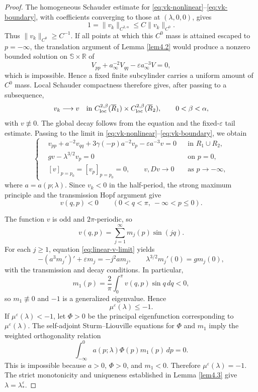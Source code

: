 \documentclass[11pt,reqno]{amsart}
\numberwithin{equation}{section}
\theoremstyle{definition}
\theoremstyle{remark}
\begin{document}
\begin{proof}
The homogeneous Schauder estimate for
\eqref{eq:vk-nonlinear}--\eqref{eq:vk-boundary}, with coefficients
converging to those at $(\lambda,0,0)$, gives
\[
 1=\|v_k\|_{C^{2,\alpha}}
 \leq C\|v_k\|_{C^0}.
\]
Thus $\|v_k\|_{C^0}\geq C^{-1}$.  If all points at which this
$C^0$ mass is attained escaped to $p=-\infty$, the translation
argument of Lemma \ref{lem4.2} would produce a nonzero bounded
solution on $\mathbb S\times\mathbb R$ of
\[
 V_{pp}+a_\infty^{-2}V_{qq}
 -\varepsilon a_\infty^{-3}V=0,
\]
which is impossible.  Hence a fixed finite subcylinder carries a
uniform amount of $C^0$ mass.  Local Schauder compactness therefore
gives, after passing to a subsequence,
\[
 v_k\longrightarrow v
 \quad\text{in }C^{2,\beta}_{\rm loc}(\overline R_1)
 \times C^{2,\beta}_{\rm loc}(\overline R_2),
 \qquad 0<\beta<\alpha,
\]
with $v\not\equiv0$.  The global decay follows from the equation and
the fixed-$\varepsilon$ tail estimate.  Passing to the limit in
\eqref{eq:vk-nonlinear}--\eqref{eq:vk-boundary}, we obtain
\begin{equation}\label{eq:linear-v-limit}
 \left\{
 \begin{aligned}
 &v_{pp}+a^{-2}v_{qq}+3\gamma(-p)a^{-2}v_p
   -\varepsilon a^{-3}v=0
   &&\text{in }R_1\cup R_2,\\
 &gv-\lambda^{3/2}v_p=0
   &&\text{on }p=0,\\
 &[v]_{p=p_0}=[v_p]_{p=p_0}=0,
 \qquad v,Dv\to0 &&\text{as }p\to-\infty,
 \end{aligned}
 \right.
\end{equation}
where $a=a(p;\lambda)$.  Since $v_k<0$ in the half-period, the
strong maximum principle and the transmission Hopf argument give
\[
 v(q,p)<0\qquad(0<q<\pi,\ -\infty<p\leq0).
\]

The function $v$ is odd and $2\pi$-periodic, so
\[
 v(q,p)=\sum_{j=1}^\infty m_j(p)\sin(jq).
\]
For each $j\geq1$, equation \eqref{eq:linear-v-limit} yields
\[
 -(a^3m_j')'+\varepsilon m_j=-j^2a m_j,
 \qquad
 \lambda^{3/2}m_j'(0)=gm_j(0),
\]
with the transmission and decay conditions.  In particular,
\[
 m_1(p)=\frac2\pi\int_0^\pi v(q,p)\sin q\,dq<0,
\]
so $m_1\not\equiv0$ and $-1$ is a generalized eigenvalue.  Hence
\[
 \mu^\varepsilon(\lambda)\leq-1.
\]
If $\mu^\varepsilon(\lambda)<-1$, let $\Phi>0$ be the principal
eigenfunction corresponding to $\mu^\varepsilon(\lambda)$.  The
self-adjoint Sturm--Liouville equations for $\Phi$ and $m_1$ imply
the weighted orthogonality relation
\[
 \int_{-\infty}^0 a(p;\lambda)\Phi(p)m_1(p)\,dp=0.
\]
This is impossible because $a>0$, $\Phi>0$, and $m_1<0$.  Therefore
$\mu^\varepsilon(\lambda)=-1$.  The strict monotonicity and
uniqueness established in Lemma \ref{lem4.3} give
$\lambda=\lambda_*^\varepsilon$.
\end{proof}
\end{document}
